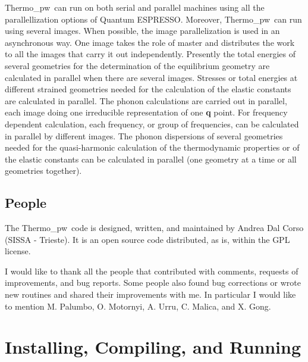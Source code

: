 \documentclass[12pt,a4paper,twoside]{report}
\def\qe{{\sc Quantum ESPRESSO}}
\def\thermo{{\sc Thermo}\_{\sc pw}}
\begin{document}
\thermo\ can run on both serial and parallel machines using all 
the parallellization options of \qe. Moreover, \thermo\ can run using 
several images.
When possible, the image parallelization is used in an asynchronous way.
One image takes the role of master and distributes the work 
to all the images that carry it out independently. Presently 
the total energies of several geometries for the determination of the 
equilibrium geometry are calculated in parallel when
there are several images. Stresses or total energies at different strained 
geometries needed for the calculation of the elastic constants are 
calculated in parallel. 
The phonon calculations are carried out in parallel, each image doing one 
irreducible representation of one {\bf q} point. For frequency dependent 
calculation, each frequency, or group of frequencies, can be calculated 
in parallel by different images.
The phonon dispersions of several geometries needed
for the quasi-harmonic calculation of the thermodynamic properties or
of the elastic constants can be calculated in parallel (one geometry at 
a time or all geometries together).

\newpage
{\color{coral}\section{People}}
\color{black}
The \thermo\ code is designed, written, and maintained by Andrea Dal Corso 
(SISSA - Trieste). It is an open source code distributed, as is, within the GPL
license.  

I would like to thank all the people that contributed with comments, requests
of improvements, and bug reports. Some people also found bug corrections or
wrote new routines and shared their improvements with me. In particular I would 
like to mention M. Palumbo, O. Motornyi, A. Urru, C. Malica, and X. Gong.

\newpage
{\color{dark-blue}\chapter{Installing, Compiling, and Running}}
\end{document}
